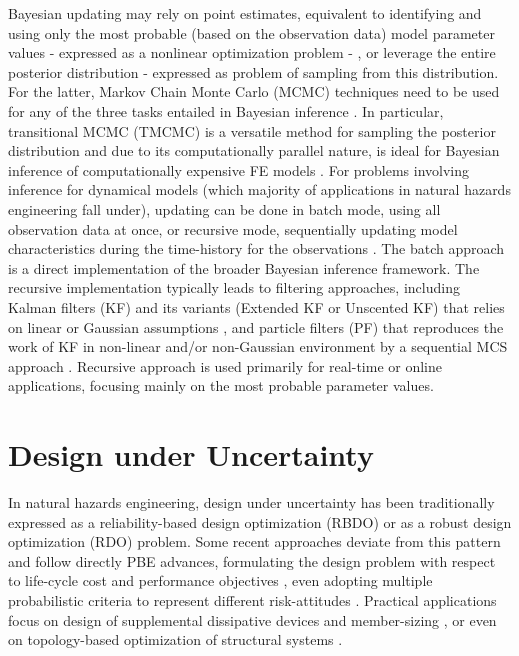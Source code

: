 Bayesian updating may rely on point estimates, equivalent to identifying and using only the most probable (based on the observation data) model parameter values - expressed as a nonlinear optimization problem - , or leverage the entire posterior distribution - expressed as problem of sampling from this distribution. For the latter, Markov Chain Monte Carlo (MCMC) techniques need to be used for any of the three tasks entailed in Bayesian inference \citep{catanach2018bayesian}. In particular, transitional MCMC (TMCMC) is a versatile method for sampling the posterior distribution \citep{ching2007transitional,betz2016transitional} and due to its computationally parallel nature, is ideal for Bayesian inference of computationally expensive FE models \citep{ramancha2021bayesian, ramancha2021bayesianupdating}. For problems involving inference for dynamical models (which majority of applications in natural hazards engineering fall under), updating can be done in batch mode, using all observation data at once, or recursive mode, sequentially updating model characteristics during the time-history for the observations \citep{astroza2017batch,ramancha2021bayesianupdating}. The batch approach is a direct implementation of the broader Bayesian inference framework. The recursive implementation typically leads to filtering approaches, including Kalman filters (KF) and its variants (Extended KF or Unscented KF) that relies on linear or Gaussian assumptions \citep{astroza2017batch,kontoroupi2017online,erazo2018bayesian}, and particle filters (PF) that reproduces the work of KF in non-linear and/or non-Gaussian environment by a sequential MCS approach \citep{chatzi2009unscented, wei2013dynamic, olivier2017particle}. Recursive approach is used primarily for real-time or online applications, focusing mainly on the most probable parameter values. 

\section{Design under Uncertainty}
\label{sec:uq_design}

In natural hazards engineering, design under uncertainty has been traditionally expressed as a reliability-based design optimization (RBDO) \citep{spence2012large, chun2019systemreliabilitybased} or as a robust design optimization (RDO) \citep{greco2015robust} problem. Some recent approaches deviate from this pattern and follow directly PBE advances, formulating the design problem with respect to life-cycle cost and performance objectives \citep{shin2014minimum}, even adopting multiple probabilistic criteria to represent different risk-attitudes \citep{haukaas2012reliabilitybased, gidaris2017multiobjective, li2018probabilistic, deb2019simplified}. Practical applications focus on design of supplemental dissipative devices \citep{shin2014minimum, gidaris2017multiobjective, altieri2018reliabilitybased} and member-sizing \citep{huang2015performancebased, suksuwan2018optimization}, or even on topology-based optimization of structural systems \citep{bobby2017reliabilitybased, zhu2017topology}.


